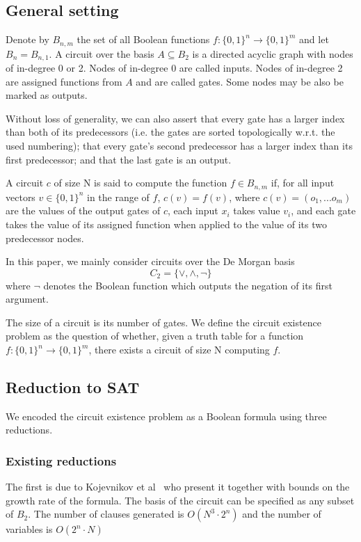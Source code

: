\documentclass{article}
\begin{document}
\subsection{General setting}

Denote by \(B_{n,m}\) the set of all Boolean functions \(f: \{0,1\}^n \to \{0,1\}^m\) and let \(B_n = B_{n,1}\). A circuit over the basis \(A \subseteq B_2\) is a directed acyclic graph with nodes of in-degree 0 or 2. Nodes of in-degree 0 are called inputs. Nodes of in-degree 2 are assigned functions from \(A\) and are called gates. Some nodes may be also be marked as outputs.

Without loss of generality, we can also assert that every gate has a larger index than both of its predecessors (i.e. the gates are sorted topologically w.r.t. the used numbering); that every gate's second predecessor has a larger index than its first predecessor; and that the last gate is an output.~\cite{kulikov}

A circuit \(c\) of size N is said to compute the function \(f\in B_{n,m}\) if, for all input vectors \(v\in\{0,1\}^n\) in the range of \(f\), \(c(v)=f(v)\), where \(c(v) = (o_1,...o_m)\) are the values of the output gates of \(c\), each input \(x_i\) takes value \(v_i\), and each gate takes the value of its assigned function when applied to the value of its two predecessor nodes.

In this paper, we mainly consider circuits over the De Morgan basis \[C_2 = \{\lor, \land, \neg\}\] where \(\neg\) denotes the Boolean function which outputs the negation of its first argument.

The size of a circuit is its number of gates. We define the circuit existence problem as the question of whether, given a truth table for a function \(f: \{0,1\}^n \to \{0,1\}^m\), there exists a circuit of size N computing \(f\).

\subsection{Reduction to SAT}

We encoded the circuit existence problem as a Boolean formula using three reductions.

\subsubsection{Existing reductions}

The first is due to Kojevnikov et al~\cite{kulikov} who present it together with bounds on the growth rate of the formula. The basis of the circuit can be specified as any subset of \(B_2\). The number of clauses generated is \(O(N^3\cdot2^n)\) and the number of variables is \(O(2^n\cdot N)\)
\end{document}

